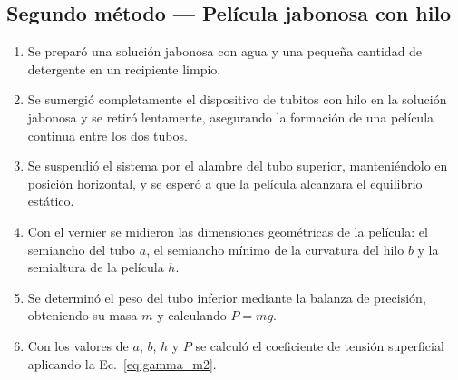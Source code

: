 \subsection{Segundo método — Película jabonosa con hilo}

\begin{enumerate}
    \item Se preparó una solución jabonosa con agua y una pequeña cantidad
    de detergente en un recipiente limpio.

    \item Se sumergió completamente el dispositivo de tubitos con hilo en
    la solución jabonosa y se retiró lentamente, asegurando la formación
    de una película continua entre los dos tubos.

    \item Se suspendió el sistema por el alambre del tubo superior,
    manteniéndolo en posición horizontal, y se esperó a que la película
    alcanzara el equilibrio estático.

    \item Con el vernier se midieron las dimensiones geométricas de la
    película: el semiancho del tubo $a$, el semiancho mínimo de la
    curvatura del hilo $b$ y la semialtura de la película $h$.

    \item Se determinó el peso del tubo inferior mediante la balanza de
    precisión, obteniendo su masa $m$ y calculando $P = mg$.

    \item Con los valores de $a$, $b$, $h$ y $P$ se calculó el coeficiente
    de tensión superficial aplicando la Ec.~\eqref{eq:gamma_m2}.
\end{enumerate}